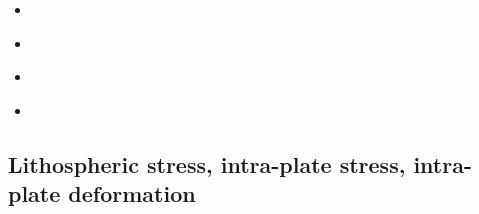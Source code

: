 \begin{scriptsize}
\begin{itemize}
\item[\nineteeneightyseven]
\cite{kamz87}
\item[\twothousandeight]
\cite{hupc08}
\item[\twothousandseventeen]
\cite{moyu17}
\item[\twothousandeighteen]
\cite{moyu18}
\end{itemize}
\end{scriptsize}


\subsection{Lithospheric stress, intra-plate stress, intra-plate deformation}

